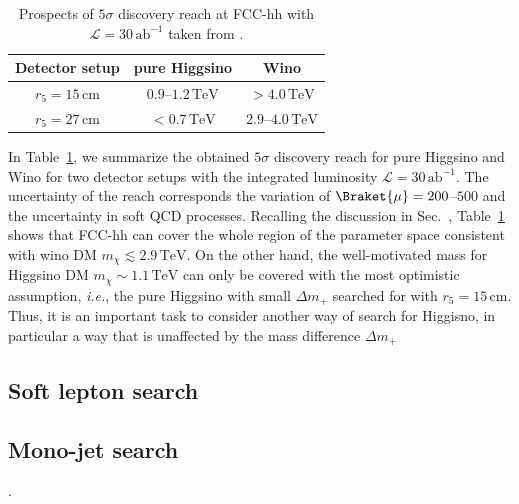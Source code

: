 \documentclass[12pt,twoside,book]{article}
\begin{document}
\begin{table}[t]
  \centering
  \begin{tabular}{c|cc}
    Detector setup & pure Higgsino & Wino \\ \hline
    $r_5 = 15\,\mathrm{cm}$ & $0.9$--$1.2\,\mathrm{TeV}$ & $> 4.0\,\mathrm{TeV}$ \\
    $r_5 = 27\,\mathrm{cm}$ & $<0.7\,\mathrm{TeV}$ & $2.9$--$4.0\,\mathrm{TeV}$
  \end{tabular}
  \caption{Prospects of $5\sigma$ discovery reach at FCC-hh with $\mathcal{L} = 30\,\mathrm{ab}^{-1}$ taken from \cite{Saito:2019rtg}.}
  \label{tab:disp_track_future}
\end{table}

In Table~\ref{tab:disp_track_future}, we summarize the obtained $5\sigma$ discovery reach for pure Higgsino and Wino for two detector setups with the integrated luminosity $\mathcal{L} = 30\,\mathrm{ab}^{-1}$.
The uncertainty of the reach corresponds the variation of $\Braket{\mu}=200$--$500$ and the uncertainty in soft QCD processes.
Recalling the discussion in Sec.~, Table~\ref{tab:disp_track_future} shows that FCC-hh can cover the whole region of the parameter space consistent with wino DM $m_\chi \lesssim 2.9\,\mathrm{TeV}$.
On the other hand, the well-motivated mass for Higgsino DM $m_\chi \sim 1.1\,\mathrm{TeV}$ can only be covered with the most optimistic assumption, \textit{i.e.}, the pure Higgsino with small $\Delta m_{+}$ searched for with $r_5 = 15\,\mathrm{cm}$.
Thus, it is an important task to consider another way of search for Higgisno, in particular a way that is unaffected by the mass difference $\Delta m_{+}$



\subsection{Soft lepton search}
\label{sec:disappearing_track}



\subsection{Mono-jet search}
\label{sec:disappearing_track}

 \cite{Baer:2014cua}.




\end{document}
